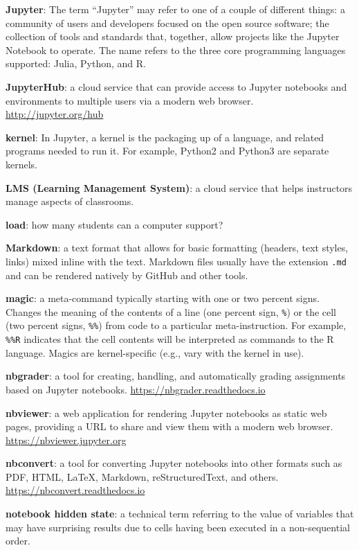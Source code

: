 \documentclass[]{book}
\begin{document}
\textbf{Jupyter}: The term ``Jupyter'' may refer to one of a couple of
different things: a community of users and developers focused on the
open source software; the collection of tools and standards that,
together, allow projects like the Jupyter Notebook to operate. The name
refers to the three core programming languages supported: Julia, Python,
and R.

\textbf{JupyterHub}: a cloud service that can provide access to Jupyter
notebooks and environments to multiple users via a modern web browser.
\url{http://jupyter.org/hub}

\textbf{kernel}: In Jupyter, a kernel is the packaging up of a language,
and related programs needed to run it. For example, Python2 and Python3
are separate kernels.

\textbf{LMS (Learning Management System)}: a cloud service that helps
instructors manage aspects of classrooms.

\textbf{load}: how many students can a computer support?

\textbf{Markdown}: a text format that allows for basic formatting
(headers, text styles, links) mixed inline with the text. Markdown files
usually have the extension \texttt{.md} and can be rendered natively by
GitHub and other tools.

\textbf{magic}: a meta-command typically starting with one or two
percent signs. Changes the meaning of the contents of a line (one
percent sign, \texttt{\%}) or the cell (two percent signs,
\texttt{\%\%}) from code to a particular meta-instruction. For example,
\texttt{\%\%R} indicates that the cell contents will be interpreted as
commands to the R language. Magics are kernel-specific (e.g., vary with
the kernel in use).

\textbf{nbgrader}: a tool for creating, handling, and automatically
grading assignments based on Jupyter notebooks.
\url{https://nbgrader.readthedocs.io}

\textbf{nbviewer}: a web application for rendering Jupyter notebooks as
static web pages, providing a URL to share and view them with a modern
web browser. \url{https://nbviewer.jupyter.org}

\textbf{nbconvert}: a tool for converting Jupyter notebooks into other
formats such as PDF, HTML, LaTeX, Markdown, reStructuredText, and
others. \url{https://nbconvert.readthedocs.io}

\textbf{notebook hidden state}: a technical term referring to the value
of variables that may have surprising results due to cells having been
executed in a non-sequential order.
\end{document}
